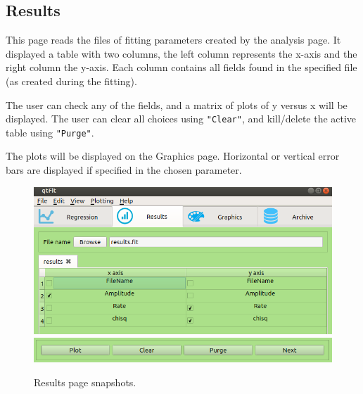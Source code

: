 \documentclass[10pt,letterpaper,oneside]{article}
\begin{document}
\newpage
\subsection{Results}
This page reads the files of fitting parameters created by the
analysis page. It displayed a table with two columns, the left column represents the x-axis and the right column the y-axis. Each column contains all fields found in the specified file (as created during the fitting).

The user can check any of the fields, and a matrix of plots of y versus x will be displayed.  The user can clear all choices using \verb+"Clear"+, and kill/delete the active table using \verb+"Purge"+. 

The plots will be displayed on the Graphics page. Horizontal or vertical error bars are displayed if specified in the chosen parameter. 

\begin{figure}[!htb]
\center
\includegraphics[width=\textwidth]{resultstop.png}
\includegraphics[width=\textwidth]{resultsbottom.png}
 \caption{Results page snapshots.}
 \label{fig-results}
 \end{figure}






\newpage
\end{document}
